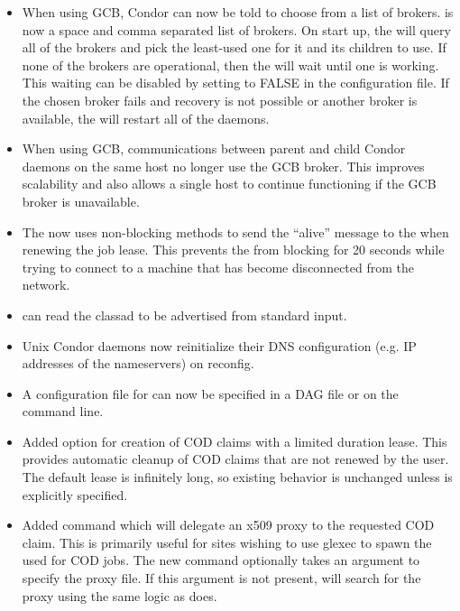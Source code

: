 \begin{itemize}
\item When using GCB, Condor can now be told to choose from a list of
brokers.  is now a space and comma separated
list of brokers. On start up, the  will query all of the
brokers and pick the least-used one for it and its children to use. If
none of the brokers are operational, then the  will wait
until one is working. This waiting can be disabled by setting 
 to FALSE in the configuration file.
If the chosen broker fails and recovery is not possible or another broker
is available, the  will restart all of the daemons.

\item When using GCB, communications between parent and child
Condor daemons on the same host no longer use the GCB broker.
This improves scalability and also allows a single host to
continue functioning if the GCB broker is unavailable.

\item The  now uses non-blocking methods to send the
``alive'' message to the  when renewing the job lease.
This prevents the  from blocking for 20 seconds while
trying to connect to a machine that has become disconnected from the
network.

\item {} can read the classad to be advertised from
standard input.

\item Unix Condor daemons now reinitialize their DNS
configuration (e.g. IP addresses of the nameservers) on reconfig.

\item A configuration file for  can now be specified
in a DAG file or on the  command line.

\item Added  option  for creation of COD claims
with a limited duration lease.  This provides automatic cleanup of COD
claims that are not renewed by the user.  The default lease is infinitely
long, so existing behavior is unchanged unless  is explicitly
specified.

\item Added  command  which will
delegate an x509 proxy to the requested COD claim.
This is primarily useful for sites wishing to use glexec to spawn the
 used for COD jobs.
The new command optionally takes an  argument to
specify the proxy file.
If this argument is not present,  will search for the
proxy using the same logic as  does.


\end{itemize}
